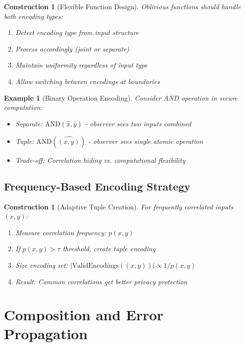 \documentclass[11pt,final]{article}
\newtheorem{example}[theorem]{Example}
\newtheorem{construction}[theorem]{Construction}
\begin{document}
\begin{construction}[Flexible Function Design]
Oblivious functions should handle both encoding types:
\begin{enumerate}
    \item Detect encoding type from input structure
    \item Process accordingly (joint or separate)
    \item Maintain uniformity regardless of input type
    \item Allow switching between encodings at boundaries
\end{enumerate}
\end{construction}

\begin{example}[Binary Operation Encoding]
Consider AND operation in secure computation:
\begin{itemize}
    \item Separate: $\text{AND}(\hat{x}, \hat{y})$ - observer sees two inputs combined
    \item Tuple: $\text{AND}(\widehat{(x,y)})$ - observer sees single atomic operation
    \item Trade-off: Correlation hiding vs. computational flexibility
\end{itemize}
\end{example}

\subsection{Frequency-Based Encoding Strategy}

\begin{construction}[Adaptive Tuple Creation]
For frequently correlated inputs $(x,y)$:
\begin{enumerate}
    \item Measure correlation frequency: $p(x,y)$
    \item If $p(x,y) > \tau$ threshold, create tuple encoding
    \item Size encoding set: $|\text{ValidEncodings}((x,y))| \propto 1/p(x,y)$
    \item Result: Common correlations get better privacy protection
\end{enumerate}
\end{construction}

\section{Composition and Error Propagation}
\end{document}
